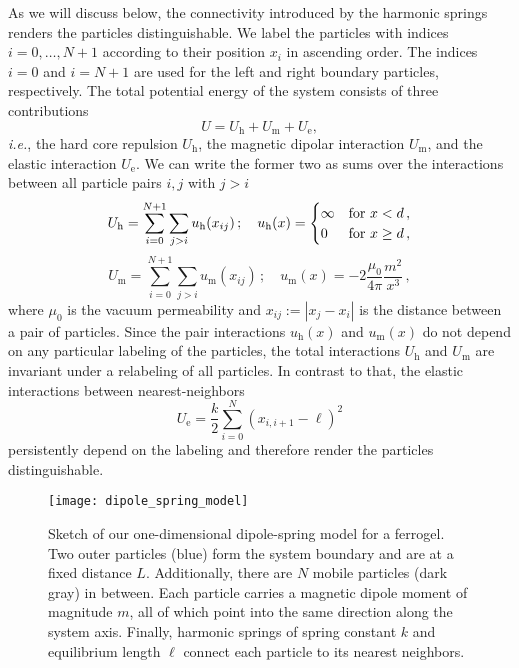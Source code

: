 \documentclass[aps,pre,twocolumn,superscriptaddress,nofootinbib]{revtex4}
\begin{document}
As we will discuss below, the connectivity introduced by the harmonic springs renders the particles distinguishable.
We label the particles with indices $i = 0, \dots, N+1$ according to their position $x_i$ in ascending order.
The indices $i = 0$ and $i = N+1$ are used for the left and right boundary particles, respectively.
The total potential energy of the system consists of three contributions
%
\begin{equation}
	U = U_\textrm{h} + U_\textrm{m} + U_\textrm{e}, 
	\label{Eq.dipole_spring_model_potential}
\end{equation}
%
\textit{i.e.}, the hard core repulsion $U_\textrm{h}$, the magnetic dipolar interaction $U_\textrm{m}$, and the elastic interaction $U_\textrm{e}$.
We can write the former two as sums over the interactions between all particle pairs $i,j$ with $j > i$ 
%
\begin{equation}
	 U_\textrm{h} = \sum_{i = 0}^{N+1} \sum_{j > i} u_\textrm{h}(x_{ij}) \, ; \quad  u_\textrm{h}(x) = \begin{cases}
		\infty	& \textnormal{for} \,\,	x < d \, ,	\\
		0	& \textnormal{for} \,\,	x \geq d \, , 
	\end{cases}
	\label{Eq.hard_interaction}
\end{equation}
%
%
\begin{equation}
	U_\textrm{m} = \sum_{i = 0}^{N+1} \sum_{j > i} u_\textrm{m}(x_{ij}) \, ; \quad u_\textrm{m}(x) =  -2 \frac{\mu_0}{4\pi} \frac{m^2}{x^3} \, ,
	\label{Eq.magnetic_interaction}
\end{equation}
%
where $\mu_0$ is the vacuum permeability and $x_{ij} := |x_j - x_i|$ is the distance between a pair of particles. 
Since the pair interactions $u_\textrm{h}(x)$ and $u_\textrm{m}(x)$ do not depend on any particular labeling of the particles, the total interactions $U_\textrm{h}$ and $U_\textrm{m}$ are invariant under a relabeling of all particles. 
In contrast to that, the elastic interactions between nearest-neighbors
%
\begin{equation}
	U_\textrm{e} = \frac{k}{2} \sum_{i = 0}^N (x_{i,i+1} - \ell)^2 
	\label{Eq.elastic_interaction}
\end{equation} 
%
persistently depend on the labeling and therefore render the particles distinguishable.

%
\begin{figure}
	\texttt{[image: dipole\_spring\_model]}
	\caption{Sketch of our one-dimensional dipole-spring model for a ferrogel. Two outer particles (blue) form the system boundary and are at a fixed distance $L$. Additionally, there are $N$ mobile particles (dark gray) in between. Each particle carries a magnetic dipole moment of magnitude $m$, all of which point into the same direction along the system axis. Finally, harmonic springs of spring constant $k$ and equilibrium length $\ell$ connect each particle to its nearest neighbors.}
	\label{Fig.dipole_spring_model}
\end{figure}
%
\end{document}
